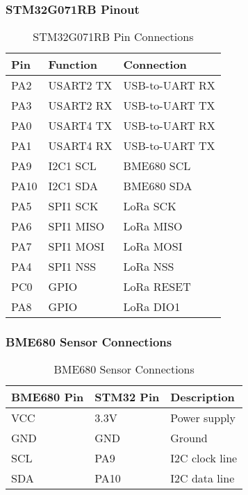 \documentclass[11pt,a4paper]{article}
\begin{document}
\subsubsection{STM32G071RB Pinout}
\begin{table}[h]
\centering
\begin{tabular}{|l|l|l|}
\hline
\textbf{Pin} & \textbf{Function} & \textbf{Connection} \\
\hline
PA2 & USART2 TX & USB-to-UART RX \\
\hline
PA3 & USART2 RX & USB-to-UART TX \\
\hline
PA0 & USART4 TX & USB-to-UART RX \\
\hline
PA1 & USART4 RX & USB-to-UART TX \\
\hline
PA9 & I2C1 SCL & BME680 SCL \\
\hline
PA10 & I2C1 SDA & BME680 SDA \\
\hline
PA5 & SPI1 SCK & LoRa SCK \\
\hline
PA6 & SPI1 MISO & LoRa MISO \\
\hline
PA7 & SPI1 MOSI & LoRa MOSI \\
\hline
PA4 & SPI1 NSS & LoRa NSS \\
\hline
PC0 & GPIO & LoRa RESET \\
\hline
PA8 & GPIO & LoRa DIO1 \\
\hline
\end{tabular}
\caption{STM32G071RB Pin Connections}
\end{table}

\subsubsection{BME680 Sensor Connections}
\begin{table}[h]
\centering
\begin{tabular}{|l|l|l|}
\hline
\textbf{BME680 Pin} & \textbf{STM32 Pin} & \textbf{Description} \\
\hline
VCC & 3.3V & Power supply \\
\hline
GND & GND & Ground \\
\hline
SCL & PA9 & I2C clock line \\
\hline
SDA & PA10 & I2C data line \\
\hline
\end{tabular}
\caption{BME680 Sensor Connections}
\end{table}
\end{document}
